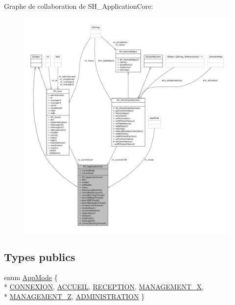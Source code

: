 Graphe de collaboration de S\-H\-\_\-\-Application\-Core\-:
\nopagebreak
\begin{figure}[H]
\begin{center}
\leavevmode
\includegraphics[width=350pt]{classSH__ApplicationCore__coll__graph}
\end{center}
\end{figure}
\subsection*{Types publics}
\begin{DoxyCompactItemize}
\item 
enum \hyperlink{classSH__ApplicationCore_a6b93b2f83a290305f282616eb2935899}{App\-Mode} \{ \\*
\hyperlink{classSH__ApplicationCore_a6b93b2f83a290305f282616eb2935899a3594de687d70f634e91ef60a63b74172}{C\-O\-N\-N\-E\-X\-I\-O\-N}, 
\hyperlink{classSH__ApplicationCore_a6b93b2f83a290305f282616eb2935899a1892b908076a0887805e80f590ecdef4}{A\-C\-C\-U\-E\-I\-L}, 
\hyperlink{classSH__ApplicationCore_a6b93b2f83a290305f282616eb2935899a16687d65e8feb3b768ff655d73a45916}{R\-E\-C\-E\-P\-T\-I\-O\-N}, 
\hyperlink{classSH__ApplicationCore_a6b93b2f83a290305f282616eb2935899ae3d0d6045024cbde467f9c8cb536c6a8}{M\-A\-N\-A\-G\-E\-M\-E\-N\-T\-\_\-\-X}, 
\\*
\hyperlink{classSH__ApplicationCore_a6b93b2f83a290305f282616eb2935899ad68aea91f508ecc6cc9fe1430ddccaf1}{M\-A\-N\-A\-G\-E\-M\-E\-N\-T\-\_\-\-Z}, 
\hyperlink{classSH__ApplicationCore_a6b93b2f83a290305f282616eb2935899a110d50af3f0d2f505021620359b6163b}{A\-D\-M\-I\-N\-I\-S\-T\-R\-A\-T\-I\-O\-N}
 \}
\end{DoxyCompactItemize}
